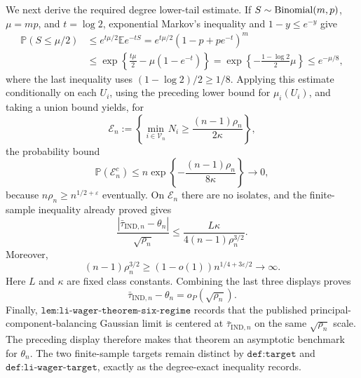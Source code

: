 We next derive the required degree lower-tail estimate.  If \(S\sim{\rm Binomial}(m,p)\), \(\mu=mp\), and \(t=\log2\), exponential Markov's inequality and \(1-y\le e^{-y}\) give
\[
\begin{aligned}
\mathbb P(S\le\mu/2)
&\le e^{t\mu/2}\mathbb E e^{-tS}
=e^{t\mu/2}(1-p+pe^{-t})^m\\
&\le\exp\!\left\{\frac{t\mu}{2}-\mu(1-e^{-t})\right\}
=\exp\!\left\{-\frac{1-\log2}{2}\mu\right\}
\le e^{-\mu/8},
\end{aligned}
\]
where the last inequality uses \((1-\log2)/2\ge1/8\).  Applying this estimate conditionally on each \(U_i\), using the preceding lower bound for \(\mu_i(U_i)\), and taking a union bound yields, for
\[
\mathcal E_n
:=\left\{\min_{i\in\mathcal V_n}N_i\ge\frac{(n-1)\rho_n}{2\kappa}\right\},
\]
the probability bound
\[
\mathbb P(\mathcal E_n^c)
\le n\exp\!\left\{-\frac{(n-1)\rho_n}{8\kappa}\right\}
\longrightarrow0,
\]
because \(n\rho_n\ge n^{1/2+\varepsilon}\) eventually.  On \(\mathcal E_n\) there are no isolates, and the finite-sample inequality already proved gives
\[
\frac{|\bar\tau_{\mathrm{IND},n}-\theta_n|}{\sqrt{\rho_n}}
\le\frac{L\kappa}{4(n-1)\rho_n^{3/2}}.
\]
Moreover,
\[
(n-1)\rho_n^{3/2}
\ge(1-o(1))n^{1/4+3\varepsilon/2}
\longrightarrow\infty.
\]
Here \(L\) and \(\kappa\) are fixed class constants.  Combining the last three displays proves
\[
\bar\tau_{\mathrm{IND},n}-\theta_n=o_P(\sqrt{\rho_n}).
\]
Finally, \(\texttt{lem:li-wager-theorem-six-regime}\) records that the published principal-component-balancing Gaussian limit is centered at \(\bar\tau_{\mathrm{IND},n}\) on the same \(\sqrt{\rho_n}\) scale.  The preceding display therefore makes that theorem an asymptotic benchmark for \(\theta_n\).  The two finite-sample targets remain distinct by \(\texttt{def:target}\) and \(\texttt{def:li-wager-target}\), exactly as the degree-exact inequality records.